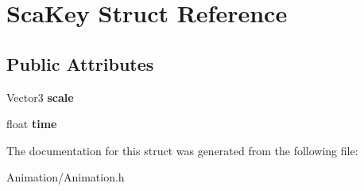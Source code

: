 \hypertarget{structScaKey}{}\section{Sca\+Key Struct Reference}
\label{structScaKey}
\subsection*{Public Attributes}
\begin{DoxyCompactItemize}
\item 
\mbox{\label{structScaKey_a32a2b51d9dafce23f6a8f23e8fe290ac}} 
Vector3 {\bfseries scale}
\item 
\mbox{\label{structScaKey_a51097f41b77a84967554499aec9e3805}} 
float {\bfseries time}
\end{DoxyCompactItemize}


The documentation for this struct was generated from the following file\+:\begin{DoxyCompactItemize}
\item 
Animation/Animation.\+h\end{DoxyCompactItemize}
